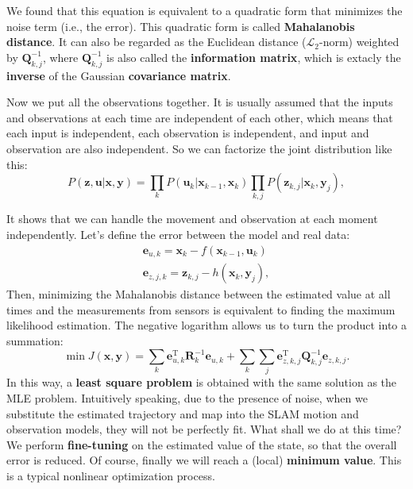 We found that this equation is equivalent to a quadratic form that minimizes the noise term (i.e., the error). This quadratic form is called \textbf{Mahalanobis distance}. It can also be regarded as the Euclidean distance ($\mathcal{L}_2$-norm) weighted by $\bm{Q}_{k,j}^{-1}$, where $\bm{Q}_{k,j} ^{-1}$ is also called the \textbf{information matrix}, which is extacly the \textbf{inverse} of the Gaussian  \textbf{covariance matrix}.

Now we put all the observations together. It is usually assumed that the inputs and observations at each time are independent of each other, which means that each input is independent, each observation is independent, and input and observation are also independent. So we can factorize the joint distribution like this:
\begin{equation}
	P\left( {\bm{z},\bm{u}|\bm{x},\bm{y}} \right) = \prod\limits_k {P\left( {{\bm{u}_k }|{\bm{x}_{k-1}},{\bm{x}_k}} \right)} \prod\limits_{k,j} {P\left( {{\bm{z} _{k,j}}|{\bm{x}_k},{\bm{y}_j}} \right)},
\end{equation}

It shows that we can handle the movement and observation at each moment independently. Let's define the error between the model and real data: 
\begin{equation}
	\begin{array}{l}
		{\bm{e}_{u,k}} = {\bm{x}_k}-f\left( {{\bm{x}_{k-1}},{\bm{u}_k} } \right)\\
		{\bm{e}_{z,j,k}} = {\bm{z}_{k,j}}-h\left( {{\bm{x}_k},{\bm{y} _j}} \right),
	\end{array}
\end{equation}
Then, minimizing the Mahalanobis distance between the estimated value at all times and the measurements from sensors is equivalent to finding the maximum likelihood estimation. The negative logarithm allows us to turn the product into a summation:
\begin{equation}
	\label{eq:least-square}
	\min J (\bm{x},\bm{y}) = \sum\limits_k {\bm{e}_{u,k}^\mathrm{T} \bm{R}_k^{-1} {\bm{e}_{u,k}}} + \sum\limits_k {\sum\limits_j {\bm{e}_{z,k,j}^\mathrm{T} \bm{Q}_ {k,j}^{-1}{\bm{e}_{z,k,j}}}}.
\end{equation}
In this way, a \textbf{least square problem} is obtained with the same solution as the MLE problem. Intuitively speaking, due to the presence of noise, when we substitute the estimated trajectory and map into the SLAM motion and observation models, they will not be perfectly fit. What shall we do at this time? We perform \textbf{fine-tuning} on the estimated value of the state, so that the overall error is reduced. Of course, finally we will reach a (local) \textbf{minimum value}. This is a typical nonlinear optimization process.

